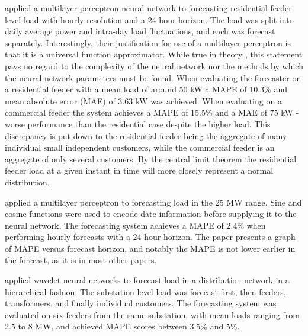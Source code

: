 \citet{Ding2016} applied a multilayer perceptron neural network to forecasting residential feeder level load with hourly resolution and a 24-hour horizon.
The load was split into daily average power and intra-day load fluctuations, and each was forecast separately.
Interestingly, their justification for use of a multilayer perceptron is that it is a universal function approximator.
While true in theory \cite{Hornik1989MultilayerFN}, this statement pays no regard to the complexity of the neural network nor the methods by which the neural network parameters must be found.
When evaluating the forecaster on a residential feeder with a mean load of around 50 kW a MAPE of 10.3\% and mean absolute error (MAE) of 3.63 kW was achieved.
When evaluating on a commercial feeder the system achieves a MAPE of 15.5\% and a MAE of 75 kW - worse performance than the residential case despite the higher load.
This discrepancy is put down to the residential feeder being the aggregate of many individual small independent customers, while the commercial feeder is an aggregate of only several customers.
By the central limit theorem the residential feeder load at a given instant in time will more closely represent a normal distribution.

\citet{Hernandez2014} applied a multilayer perceptron to forecasting load in the 25 MW range.
Sine and cosine functions were used to encode date information before supplying it to the neural network.
The forecasting system achieves a MAPE of 2.4\% when performing hourly forecasts with a 24-hour horizon.
The paper presents a graph of MAPE versus forecast horizon, and notably the MAPE is not lower earlier in the forecast, as it is in most other papers.

\citet{Sun2016} applied wavelet neural networks to forecast load in a distribution network in a hierarchical fashion.
The substation level load was forecast first, then feeders, transformers, and finally individual customers.
The forecasting system was evaluated on six feeders from the same substation, with mean loads ranging from 2.5 to 8 MW, and achieved MAPE scores between 3.5\% and 5\%.


